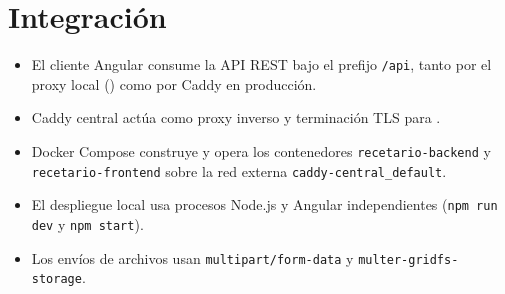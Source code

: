 \section{Integración}

\begin{itemize}[leftmargin=*]
  \item El cliente Angular consume la API REST bajo el prefijo \texttt{/api}, tanto por el proxy local () como por Caddy en producción.
  \item Caddy central actúa como proxy inverso y terminación TLS para .
  \item Docker Compose construye y opera los contenedores \texttt{recetario-backend} y \texttt{recetario-frontend} sobre la red externa \texttt{caddy-central\_default}.
  \item El despliegue local usa procesos Node.js y Angular independientes (\texttt{npm run dev} y \texttt{npm start}).
  \item Los envíos de archivos usan \texttt{multipart/form-data} y \texttt{multer-gridfs-storage}.
\end{itemize}
